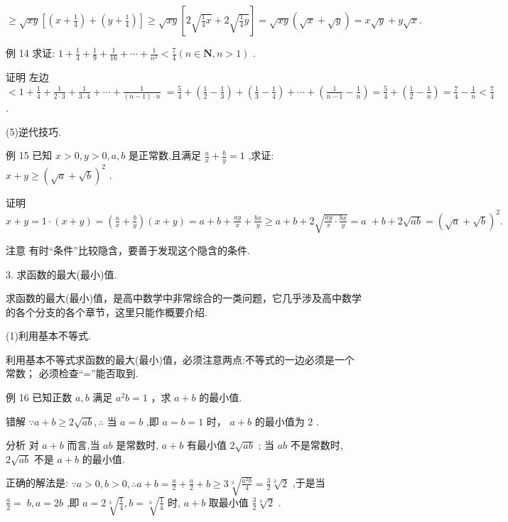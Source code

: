 \documentclass[10pt]{article}
\begin{document}
\(\geq  \sqrt{xy}\left\lbrack  {\left( {x + \frac{1}{4}}\right)  + \left( {y + \frac{1}{4}}\right) }\right\rbrack   \geq  \sqrt{xy}\left\lbrack  {2\sqrt{\frac{1}{4}x} + 2\sqrt{\frac{1}{4}y}}\right\rbrack   = \sqrt{xy}\left( {\sqrt{x} + \sqrt{y}}\right)  = x\sqrt{y} + y\sqrt{x}.\)

例 14 求证: \(1 + \frac{1}{4} + \frac{1}{9} + \frac{1}{16} + \cdots  + \frac{1}{{n}^{2}} < \frac{7}{4}\left( {n \in  \mathbf{N},n > 1}\right)\) .

证明 左边 \(< 1 + \frac{1}{4} + \frac{1}{2 \cdot  3} + \frac{1}{3 \cdot  4} + \cdots  + \frac{1}{\left( {n - 1}\right)  \cdot  n} \; = \frac{5}{4} + \left( {\frac{1}{2} - \frac{1}{3}}\right)  + \left( {\frac{1}{3} - \frac{1}{4}}\right)  + \cdots  + \left( {\frac{1}{n - 1} - \frac{1}{n}}\right)  = \frac{5}{4} + \left( {\frac{1}{2} - \frac{1}{n}}\right)  = \frac{7}{4} - \frac{1}{n} < \frac{7}{4}\) .

(5)逆代技巧.

例 15 已知 \(x > 0,y > 0,a,b\) 是正常数,且满足 \(\frac{a}{x} + \frac{b}{y} = 1\) ,求证: \(x + y \geq  {\left( \sqrt{a} + \sqrt{b}\right) }^{2}\) .

证明 \(x + y = 1 \cdot  \left( {x + y}\right)  = \left( {\frac{a}{x} + \frac{b}{y}}\right) \left( {x + y}\right)  = a + b + \frac{ay}{x} + \frac{bx}{y} \geq  a + b + 2\sqrt{\frac{ay}{x} \cdot  \frac{bx}{y}} = a \; + b + 2\sqrt{ab} = {\left( \sqrt{a} + \sqrt{b}\right) }^{2}.\)

注意 有时“条件”比较隐含，要善于发现这个隐含的条件.

3. 求函数的最大(最小)值.

求函数的最大(最小)值，是高中数学中非常综合的一类问题，它几乎涉及高中数学的各个分支的各个章节，这里只能作概要介绍.

(1)利用基本不等式.

利用基本不等式求函数的最大(最小)值，必须注意两点:不等式的一边必须是一个常数； 必须检查“=”能否取到.

例 16 已知正数 \(a,b\) 满足 \({a}^{2}b = 1\) ，求 \(a + b\) 的最小值.

错解 \(\because a + b \geq  2\sqrt{ab},\therefore\) 当 \(a = b\) ,即 \(a = b = 1\) 时， \(a + b\) 的最小值为 2 .

分析 对 \(a + b\) 而言,当 \({ab}\) 是常数时, \(a + b\) 有最小值 \(2\sqrt{ab}\) ; 当 \({ab}\) 不是常数时, \(2\sqrt{ab}\) 不是 \(a + b\) 的最小值.

正确的解法是: \(\because a > 0,b > 0,\therefore a + b = \frac{a}{2} + \frac{a}{2} + b \geq  3\sqrt[3]{\frac{{a}^{2}b}{4}} = \frac{3}{2}\sqrt[3]{2}\) ,于是当 \(\frac{a}{2} = \; b,a = {2b}\) ,即 \(a = 2\sqrt[3]{\frac{1}{4}},b = \sqrt[3]{\frac{1}{4}}\) 时, \(a + b\) 取最小值 \(\frac{3}{2}\sqrt[3]{2}\) .
\end{document}

